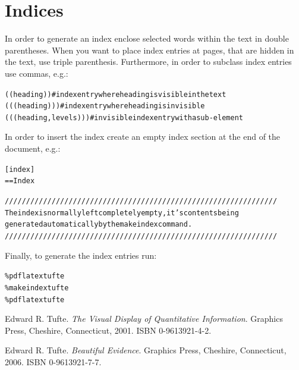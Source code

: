 \documentclass[10pt,a4paper,oneside,BCOR5mm]{scrartcl}
\begin{document}
\section{Indices}
\label{_indices}
 \par\noindent{}In order to generate an index enclose selected words within the text in double parentheses. When you want to place index entries at pages, that are hidden in the text, use triple parenthesis.
Furthermore, in order to subclass index entries use commas, e.g.:
\begin{alltt}((heading))            \#{} index entry where heading is visible in the text
(((heading)))          \#{} index entry where heading is invisible
(((heading,levels)))   \#{} invisible index entry with a sub-element\end{alltt}
 \par\noindent{}In order to insert the index create an empty index section at the end of the document, e.g.:
\begin{alltt}[index]
== Index

////////////////////////////////////////////////////////////////
The index is normally left completely empty, it's contents being
generated automatically by the makeindex command.
////////////////////////////////////////////////////////////////\end{alltt}
 \par\noindent{}Finally, to generate the index entries run:
\begin{alltt}\%{} pdflatex tufte
\%{} makeindex tufte
\%{} pdflatex tufte\end{alltt}
\label{_references}\hypertarget{_references}{}
\begin{thebibliography}{99}
  \begin{bibliography} 

  \label{tufte01}\hypertarget{tufte01}{} Edward R. Tufte.
\emph{The Visual Display of Quantitative Information}.
Graphics Press, Cheshire, Connecticut, 2001.
ISBN 0-9613921-4-2. \newline{}


  \label{tufte06}\hypertarget{tufte06}{} Edward R. Tufte. \emph{Beautiful Evidence}.
Graphics Press, Cheshire, Connecticut, 2006.
ISBN 0-9613921-7-7.

 \end{bibliography}
\end{thebibliography}
\setindexpreamble{
}
\label{_index}\hypertarget{_index}{}
\printindex
\label{footer}\hypertarget{footer}{}
\end{document}
